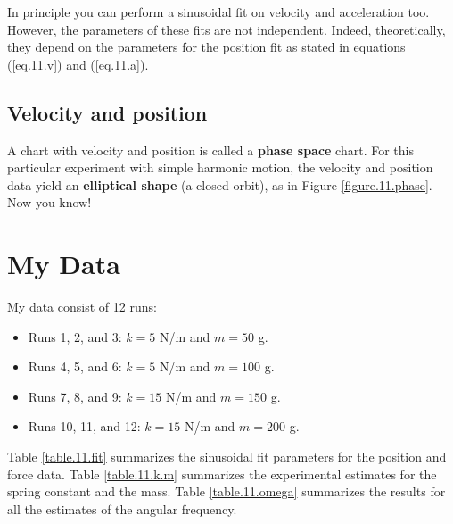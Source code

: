 In principle you can perform a sinusoidal fit on velocity and acceleration too. However, the parameters of these fits are not independent. Indeed, theoretically, they depend on the parameters for the position fit as stated in equations (\ref{eq.11.v}) and (\ref{eq.11.a}).
%
\subsection{Velocity and position}
%
A chart with velocity and position is called a \textbf{phase space} chart. For this particular experiment with simple harmonic motion, the velocity and position data yield an \textbf{elliptical shape} (a closed orbit), as in Figure \ref{figure.11.phase}. Now you know!
%
\section{My Data}
%
My data consist of 12 runs:
\begin{itemize}
    \item Runs 1, 2, and 3: $k = 5$ N/m and $m = 50$ g.
    \item Runs 4, 5, and 6: $k = 5$ N/m and $m = 100$ g.
    \item Runs 7, 8, and 9: $k = 15$ N/m and $m = 150$ g.
    \item Runs 10, 11, and 12: $k = 15$ N/m and $m = 200$ g.
\end{itemize}
Table \ref{table.11.fit} summarizes the sinusoidal fit parameters for the position and force data. Table \ref{table.11.k.m} summarizes the experimental estimates for the spring constant and the mass. Table \ref{table.11.omega} summarizes the results for all the estimates of the angular frequency.
%

